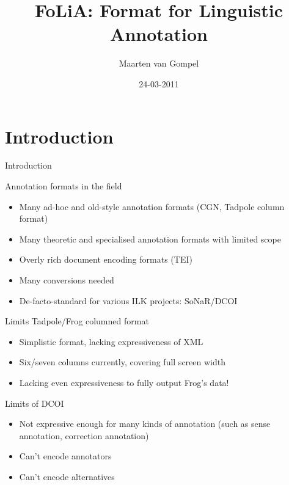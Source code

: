 \documentclass[compress]{beamer}
\title{FoLiA: Format for Linguistic Annotation}
\author{Maarten van Gompel}
\date{24-03-2011}
\begin{document}
\begin{frame}
	\titlepage\smallraccoon\ilkuvt
\end{frame}

\section{Introduction}

\begin{frame}{Introduction}

    \begin{block}{Annotation formats in the field}
        \begin{itemize}
            \item Many ad-hoc and old-style annotation formats (CGN, Tadpole column format) 
            \item Many theoretic and specialised annotation formats with limited scope
            \item Overly rich document encoding formats (TEI)
            \item Many conversions needed
            \item De-facto-standard for various ILK projects: SoNaR/DCOI
        \end{itemize}
    \end{block}

\end{frame}
    
\begin{frame}

    \begin{block}{Limits Tadpole/Frog columned format}
        \begin{itemize}
            \item Simplistic format, lacking expressiveness of XML
            \item Six/seven columns currently, covering full screen width
            \item Lacking even expressiveness to fully output Frog's data!
        \end{itemize}
    \end{block}
    
\end{frame}
    
    
\begin{frame}
    \begin{block}{Limits of DCOI}
        \begin{itemize}
            \item Not expressive enough for many kinds of annotation (such as sense annotation, correction annotation)
            \item Can't encode annotators
            \item Can't encode alternatives
        \end{itemize}
    \end{block}
    
\end{frame}    
\end{document}
